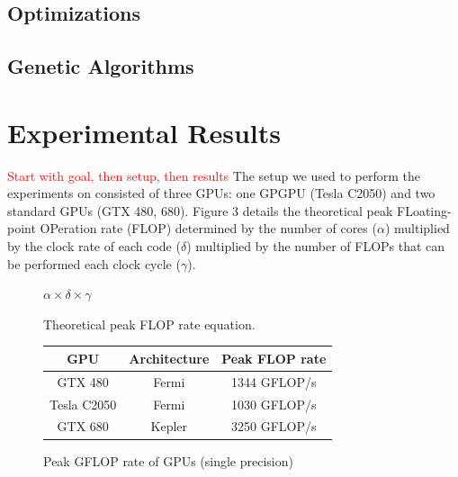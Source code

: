 \documentclass[conference]{IEEEtran}
\newcommand {\todo}[1] {\textcolor{red}{#1}}
\begin{document}

\subsection{Optimizations}

\subsection{Genetic Algorithms}

\section{Experimental Results}
\todo{Start with goal, then setup, then results}
The setup we used to perform the experiments on consisted of three GPUs: one GPGPU (Tesla C2050) and two standard GPUs (GTX 480, 680). Figure 3 details the theoretical peak FLoating-point OPeration rate (FLOP) determined by the number of cores ($\alpha$) multiplied by the clock rate of each code ($\delta$) multiplied by the number of FLOPs that can be performed each clock cycle ($\gamma$).
\begin{figure}[h]
	\centering
	$\alpha\times\delta\times\gamma$
	\caption{Theoretical peak FLOP rate equation.}
\end{figure}

\begin{figure}[h]
	\begin{center}
		\begin{tabular}
		{|c|c|c|}
			\hline
			GPU & Architecture & Peak FLOP rate\\
			\hline
			GTX 480 & Fermi & 1344 GFLOP/s\\
			Tesla C2050 & Fermi & 1030 GFLOP/s\\
			GTX 680 & Kepler & 3250 GFLOP/s\\
			\hline
		\end{tabular}
	\end{center}
	\caption{Peak GFLOP rate of GPUs (single precision)}
\end{figure}
\end{document}

